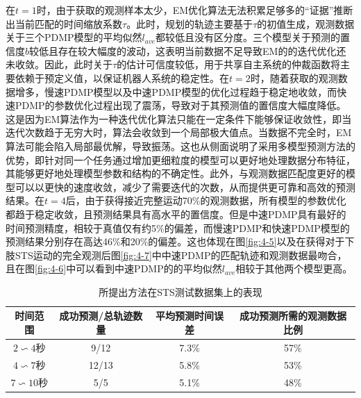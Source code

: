 在$t=1$时，由于获取的观测样本太少，EM优化算法无法积累足够多的``证据''推断出当前匹配的时间缩放系数$\tau$。此时，规划的轨迹主要基于$\tau$的初值生成，观测数据关于三个PDMP模型的平均似然$l_{ave}$都较低且没有区分度。三个模型关于预测的置信度$b$较低且存在较大幅度的波动，这表明当前数据不足导致EM的的迭代优化还未收敛。因此，此时关于$\tau$的估计可信度较低，用于共享自主系统的仲裁函数将主要依赖于预定义值，以保证机器人系统的稳定性。在$t=2$时，随着获取的观测数据增多，慢速PDMP模型以及中速PDMP模型的优化过程趋于稳定地收敛，而快速PDMP的参数优化过程出现了震荡，导致对于其预测值的置信度大幅度降低。这是因为EM算法作为一种迭代优化算法只能在一定条件下能够保证收敛性，即当迭代次数趋于无穷大时，算法会收敛到一个局部极大值点。当数据不完全时，EM算法可能会陷入局部最优解，导致振荡。这也从侧面说明了采用多模型预测方法的优势，即针对同一个任务通过增加更细粒度的模型可以更好地处理数据分布特征，其能够更好地处理模型参数和结构的不确定性。此外，与观测数据匹配度更好的模型可以以更快的速度收敛，减少了需要迭代的次数，从而提供更可靠和高效的预测结果。在$t=4$后，由于获得接近完整运动70\%的观测数据，所有模型的参数优化都趋于稳定收敛，且预测结果具有高水平的置信度。但是中速PDMP具有最好的时间预测精度，相较于真值仅有约5\%的偏差，而慢速PDMP和快速PDMP模型的预测结果分别存在高达46\%和20\%的偏差。这也体现在图\ref{fig:4-5}以及在获得对于下肢STS运动的完全观测后图\ref{fig:4-7}中中速PDMP的匹配轨迹和观测数据最吻合，且在图\ref{fig:4-6}中可以看到中速PDMP的的平均似然$l_{ave}$相较于其他两个模型更高。
\begin{table}[htb]
    \centering
    \caption{所提出方法在STS测试数据集上的表现}
    \setlength{\tabcolsep}{5pt}
    \begin{tabular}{c c c c}
    \hline\hline
     时间范围 & 成功预测/总轨迹数量 & 平均预测时间误差 & 成功预测所需的观测数据比例\\  
    \hline
    $2\backsim 4$秒& 9/12 & 7.3\%& 57\%\\ 
    $4\backsim 7$秒& 12/13 & 5.8\%& 53\%\\ 
    $7\backsim 10$秒& 5/5 & 5.1\%& 48\%\\ 
    \hline\hline
    \end{tabular}
    \label{tab:4-1}
\end{table}    

